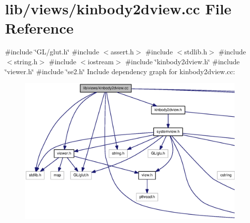 \section{lib/views/kinbody2dview.cc \-File \-Reference}
\label{kinbody2dview_8cc}
{\ttfamily \#include \char`\"{}\-G\-L/glut.\-h\char`\"{}}\*
{\ttfamily \#include $<$assert.\-h$>$}\*
{\ttfamily \#include $<$stdlib.\-h$>$}\*
{\ttfamily \#include $<$string.\-h$>$}\*
{\ttfamily \#include $<$iostream$>$}\*
{\ttfamily \#include \char`\"{}kinbody2dview.\-h\char`\"{}}\*
{\ttfamily \#include \char`\"{}viewer.\-h\char`\"{}}\*
{\ttfamily \#include \char`\"{}se2.\-h\char`\"{}}\*
\-Include dependency graph for kinbody2dview.\-cc\-:
\nopagebreak
\begin{figure}[H]
\begin{center}
\leavevmode
\includegraphics[width=350pt]{kinbody2dview_8cc__incl}
\end{center}
\end{figure}
